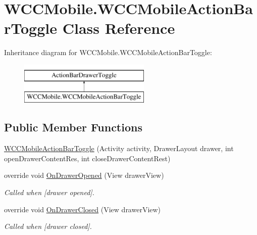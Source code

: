 \hypertarget{class_w_c_c_mobile_1_1_w_c_c_mobile_action_bar_toggle}{}\section{W\+C\+C\+Mobile.\+W\+C\+C\+Mobile\+Action\+Bar\+Toggle Class Reference}
\label{class_w_c_c_mobile_1_1_w_c_c_mobile_action_bar_toggle}
Inheritance diagram for W\+C\+C\+Mobile.\+W\+C\+C\+Mobile\+Action\+Bar\+Toggle\+:\begin{figure}[H]
\begin{center}
\leavevmode
\includegraphics[height=2.000000cm]{class_w_c_c_mobile_1_1_w_c_c_mobile_action_bar_toggle}
\end{center}
\end{figure}
\subsection*{Public Member Functions}
\begin{DoxyCompactItemize}
\item 
\hyperlink{class_w_c_c_mobile_1_1_w_c_c_mobile_action_bar_toggle_a26328b707632ee12dba2d833f8a03dc0}{W\+C\+C\+Mobile\+Action\+Bar\+Toggle} (Activity activity, Drawer\+Layout drawer, int open\+Drawer\+Content\+Res, int close\+Drawer\+Content\+Rest)
\item 
override void \hyperlink{class_w_c_c_mobile_1_1_w_c_c_mobile_action_bar_toggle_acaababedc91f67db74e8d6811b7fa061}{On\+Drawer\+Opened} (View drawer\+View)
\begin{DoxyCompactList}\small\item\em Called when \mbox{[}drawer opened\mbox{]}. \end{DoxyCompactList}\item 
override void \hyperlink{class_w_c_c_mobile_1_1_w_c_c_mobile_action_bar_toggle_ab3e592f17cb6b208ae226e0f6263c47d}{On\+Drawer\+Closed} (View drawer\+View)
\begin{DoxyCompactList}\small\item\em Called when \mbox{[}drawer closed\mbox{]}. \end{DoxyCompactList}\end{DoxyCompactItemize}
